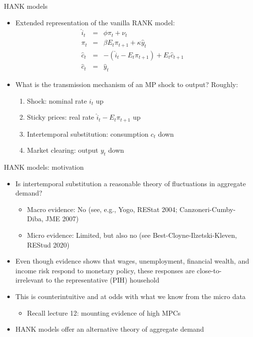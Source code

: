 \documentclass[9pt]{beamer}
\begin{document}
\begin{frame}{HANK models}
\begin{itemize}
	\setlength\itemsep{1.5em}
	\item Extended representation of the vanilla RANK model:
	\begin{eqnarray*}
		\hat{i}_{t} & = & \phi\pi_{t}+\nu_{t}\\
		\pi_{t} & = & \beta E_{t}\pi_{t+1}+\kappa\hat{y}_{t}\\
		\hat{c}_{t} & = & -(\hat{i}_{t}-E_{t}\pi_{t+1})+E_{t}\hat{c}_{t+1}\\
		\hat{c}_{t} & = & \hat{y}_{t}
	\end{eqnarray*}
	\item What is the transmission mechanism of an MP shock to output? Roughly:
	\begin{enumerate}
			\setlength\itemsep{0.5em}
		\item Shock: nominal rate $i_{t}$ up
		\item Sticky prices: real rate $\hat{i}_{t}-E_{t}\pi_{t+1}$ up
		\item Intertemporal substitution: consumption $c_{t}$ down
		\item Market clearing: output $y_{t}$ down
	\end{enumerate}
\end{itemize}
\end{frame}
%
\begin{frame}{HANK models: motivation}
\begin{itemize}
	\setlength\itemsep{1.5em}
\item Is intertemporal substitution a reasonable theory of fluctuations in aggregate demand?
\begin{itemize}
	\setlength\itemsep{0.5em}	
	
	\item Macro evidence: No (see, e.g., Yogo, REStat 2004; Canzoneri-Cumby-Diba,
	JME 2007)
	\item Micro evidence: Limited, but also no (see Best-Cloyne-Ilzetski-Kleven,
	REStud 2020)
\end{itemize}

\item Even though evidence shows that wages, unemployment, financial wealth, and income risk respond
to monetary policy, these responses are close-to-irrelevant to the representative (PIH) household

\item This is counterintuitive and at odds with what we know from the micro data
\begin{itemize}
	\item Recall lecture 12: mounting evidence of high MPCs
\end{itemize}

\item HANK models offer an alternative theory of aggregate demand
\end{itemize}
\end{frame}
\end{document}

